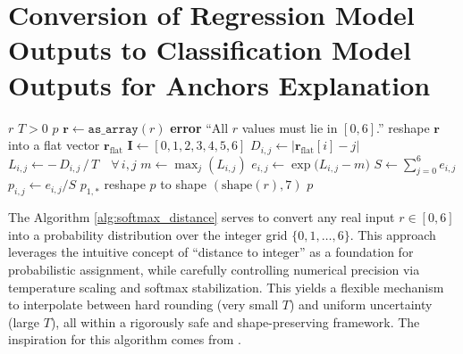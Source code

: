 \section{Conversion of Regression Model Outputs to Classification Model Outputs for Anchors Explanation}
\label{app:anchors}


\begin{algorithm}[htbp]
   \caption{Softmax-over-Distance Probability Mapping}
   \label{alg:softmax_distance}
   \begin{algorithmic}[1]
     \Require $r$ 
     \Require $T>0$         
     \Ensure $p$            
     \State $\mathbf{r} \gets \texttt{as\_array}(r)$
       \State \textbf{error} “All $r$ values must lie in $[0,6]$.”
     \EndIf
     \State reshape $\mathbf{r}$ into a flat vector $\mathbf{r}_{\mathrm{flat}}$
     \State $\mathbf{I} \gets [0,1,2,3,4,5,6]$
     \State {}
         \State $D_{i,j} \gets \bigl|\mathbf{r}_{\mathrm{flat}}[i] - j\bigr|$
       \EndFor
     \EndFor
     \State {}
     \State $L_{i,j} \gets -\,D_{i,j}\,/\,T \quad\forall\,i,j$
     \State {}
       \State $m \gets \max_{j}(L_{i,j})$
         \State $e_{i,j} \gets \exp\bigl(L_{i,j} - m\bigr)$
       \EndFor
       \State $S \gets \sum_{j=0}^{6} e_{i,j}$
         \State $p_{i,j} \gets e_{i,j} / S$
       \EndFor
     \EndFor
     \State {}
       \State \Return $p_{1,\ast}$    
     \Else
       \State reshape $p$ to shape $(\text{shape}(r),7)$
       \State \Return $p$
     \EndIf
   \end{algorithmic}
\end{algorithm}


The Algorithm \ref{alg:softmax_distance} serves to convert any real input \(r\in[0,6]\) into a probability distribution over the integer grid \(\{0,1,\dots,6\}\). This approach leverages the intuitive concept of “distance to integer” as a foundation for probabilistic assignment, while carefully controlling numerical precision via temperature scaling and softmax stabilization. This yields a flexible mechanism to interpolate between hard rounding (very small \(T\)) and uniform uncertainty (large \(T\)), all within a rigorously safe and shape-preserving framework. The inspiration for this algorithm comes from \cite{murphy_machine_2012}.




